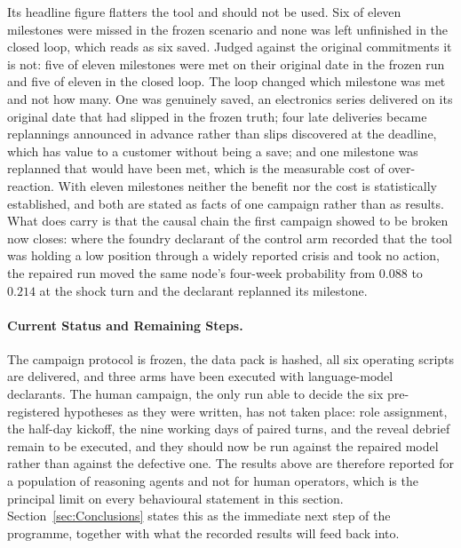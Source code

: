 Its headline figure flatters the tool and should not be used. Six of eleven milestones were missed in the frozen scenario and none was left unfinished in the closed loop, which reads as six saved. Judged against the original commitments it is not: five of eleven milestones were met on their original date in the frozen run and five of eleven in the closed loop. The loop changed which milestone was met and not how many. One was genuinely saved, an electronics series delivered on its original date that had slipped in the frozen truth; four late deliveries became replannings announced in advance rather than slips discovered at the deadline, which has value to a customer without being a save; and one milestone was replanned that would have been met, which is the measurable cost of over-reaction. With eleven milestones neither the benefit nor the cost is statistically established, and both are stated as facts of one campaign rather than as results. What does carry is that the causal chain the first campaign showed to be broken now closes: where the foundry declarant of the control arm recorded that the tool was holding a low position through a widely reported crisis and took no action, the repaired run moved the same node's four-week probability from $0.088$ to $0.214$ at the shock turn and the declarant replanned its milestone.

\paragraph{Current Status and Remaining Steps.}
The campaign protocol is frozen, the data pack is hashed, all six operating scripts are delivered, and three arms have been executed with language-model declarants. The human campaign, the only run able to decide the six pre-registered hypotheses as they were written, has not taken place: role assignment, the half-day kickoff, the nine working days of paired turns, and the reveal debrief remain to be executed, and they should now be run against the repaired model rather than against the defective one. The results above are therefore reported for a population of reasoning agents and not for human operators, which is the principal limit on every behavioural statement in this section. Section~\ref{sec:Conclusions} states this as the immediate next step of the programme, together with what the recorded results will feed back into.
